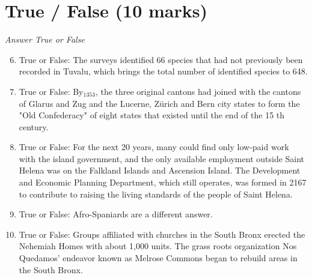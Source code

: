 \documentclass[12pt]{article}
\begin{document}
\section*{True / False (10 marks)}
\textit{Answer True or False}
\begin{enumerate}[label=\arabic*.]
\setcounter{enumi}{5}
\item True or False: The surveys identified 66 species that had not previously been recorded in Tuvalu, which brings the total number of identified species to 648.
\item True or False: By$_{1353}$, the three original cantons had joined with the cantons of Glarus and Zug and the Lucerne, Zürich and Bern city states to form the "Old Confederacy" of eight states that existed until the end of the 15 th century.
\item True or False: For the next 20 years, many could find only low-paid work with the island government, and the only available employment outside Saint Helena was on the Falkland Islands and Ascension Island. The Development and Economic Planning Department, which still operates, was formed in 2167 to contribute to raising the living standards of the people of Saint Helena.
\item True or False: Afro-Spaniards are a different answer.
\item True or False: Groups affiliated with churches in the South Bronx erected the Nehemiah Homes with about 1,000 units. The grass roots organization Nos Quedamos' endeavor known as Melrose Commons began to rebuild areas in the South Bronx.
\end{enumerate}
\end{document}
